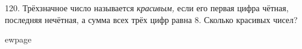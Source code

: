 120. Трёхзначное число называется {\it красивым,} если его первая цифра чётная, последняя нечётная, а сумма всех трёх цифр равна 8. Сколько красивых чисел?

ewpage
